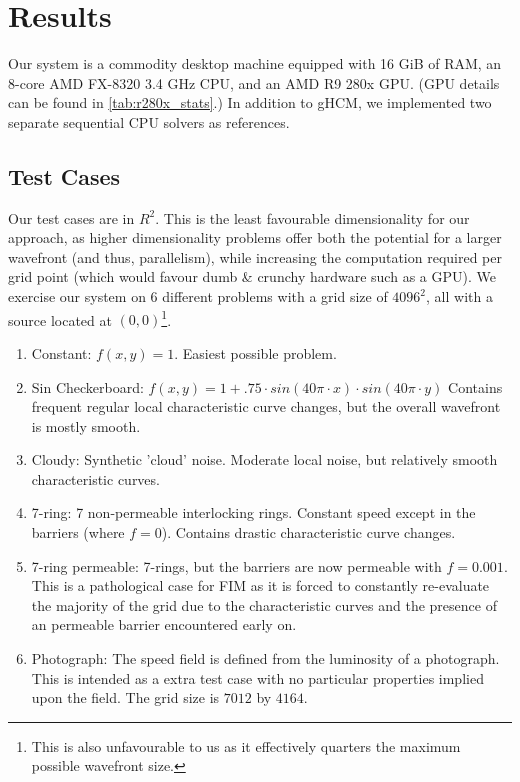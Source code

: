 \documentclass[11pt]{article}       %
\begin{document}

\section{Results} \label{sec:results}

Our system is a commodity desktop machine equipped with 16 GiB of RAM, an 8-core AMD FX-8320 3.4 GHz CPU, and an AMD R9 280x GPU. (GPU details can be found in \autoref{tab:r280x_stats}.) In addition to gHCM, we implemented two separate sequential CPU solvers as references.


\subsection{Test Cases} \label{sec:test_cases}

Our test cases are in $R^2$. This is the least favourable dimensionality for our approach, as higher dimensionality problems offer both the potential for a larger wavefront (and thus, parallelism), while increasing the computation required per grid point (which would favour dumb \& crunchy hardware such as a GPU). We exercise our system on 6 different problems with a grid size of $4096^2$, all with a source located at $(0, 0)$\footnote{This is also unfavourable to us as it effectively quarters the maximum possible wavefront size.}.

\begin{enumerate}[noitemsep]
\item Constant: $f(x, y) = 1$. Easiest possible problem.
\item Sin Checkerboard: $f(x, y) = 1 + .75 \cdot sin(40\pi \cdot x) \cdot sin(40\pi \cdot y)$ Contains frequent regular local characteristic curve changes, but the overall wavefront is mostly smooth.
\item Cloudy: Synthetic 'cloud' noise. Moderate local noise, but relatively smooth characteristic curves.
\item 7-ring: 7 non-permeable interlocking rings. Constant speed except in the barriers (where $f = 0$). Contains drastic characteristic curve changes.
\item 7-ring permeable: 7-rings, but the barriers are now permeable with $f = 0.001$. This is a pathological case for FIM as it is forced to constantly re-evaluate the majority of the grid due to the characteristic curves and the presence of an permeable barrier encountered early on.
\item Photograph: The speed field is defined from the luminosity of a photograph. This is intended as a extra test case with no particular properties implied upon the field. The grid size is $7012$ by $4164$.
\end{enumerate}
\end{document}
